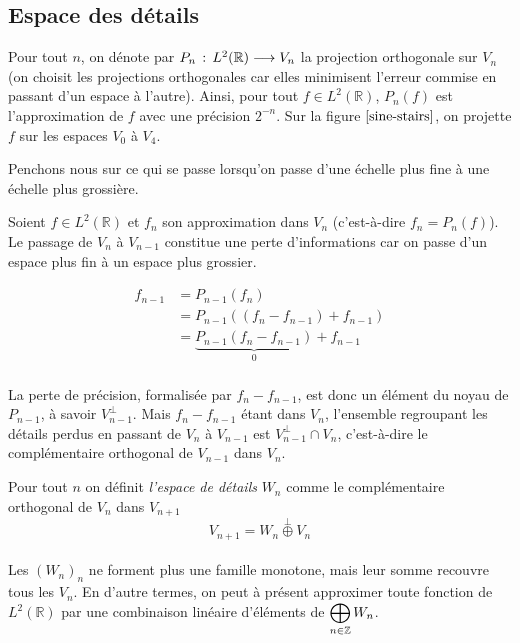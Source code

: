 	\newpage
		
	\subsection{Espace des détails}
	
	Pour tout $n$, on dénote par $P_n \, : \, L^2(\mathbb{R}) \longrightarrow V_n$ la projection orthogonale sur $V_n$ (on choisit les projections orthogonales car elles minimisent l'erreur commise en passant d'un espace à l'autre). Ainsi, pour tout $f \in L^2(\mathbb{R})$, $P_n (f)$ est l'approximation de $f$ avec une précision $2^{-n}$. Sur la figure $\ref{sine-stairs}$, on projette $f$ sur les espaces $V_0$ à $V_4$.
	
	Penchons nous sur ce qui se passe lorsqu'on passe d'une échelle plus fine à une échelle plus grossière.
	
	Soient $f \in L^2(\mathbb{R})$ et $f_n$ son approximation dans $V_n$ (c'est-à-dire $f_n = P_n(f)$). Le passage de $V_n$ à $V_{n-1}$ constitue une perte d'informations car on passe d'un espace plus fin à un espace plus grossier.
	
	\begin{align*}
		f_{n-1} &= P_{n-1} (f_n) \\
		&= P_{n-1}( (f_n - f_{n-1}) + f_{n-1}) \\
		&= \underbrace{P_{n-1} (f_n - f_{n-1})}_{0} + f_{n-1} \\
	\end{align*}
	
	La perte de précision, formalisée par $f_n - f_{n-1}$, est donc un élément du noyau de $P_{n-1}$, à savoir $V_{n-1}^\bot$. Mais $f_n - f_{n-1}$ étant dans $V_{n}$, l'ensemble regroupant les détails perdus en passant de $V_n$ à $V_{n-1}$ est $V_{n-1}^\bot \cap V_n$, c'est-à-dire le complémentaire orthogonal de $V_{n-1}$ dans $V_n$.
	
	\begin{mydef}
		Pour tout $n$ on définit \textit{l'espace de détails} $W_{n}$ comme le complémentaire orthogonal de $V_{n}$ dans $V_{n+1}$ $$V_{n+1} = W_n \stackrel{\perp}{\oplus} V_n$$
	\end{mydef}
	
	\paragraph*{}
	Les $(W_n)_n$ ne forment plus une famille monotone, mais leur somme recouvre tous les $V_n$. En d'autre termes, on peut à présent approximer toute fonction de $L^2(\mathbb{R})$ par une combinaison linéaire d'éléments de $\displaystyle \bigoplus_{n \in \mathbb{Z}} W_n$.
	
